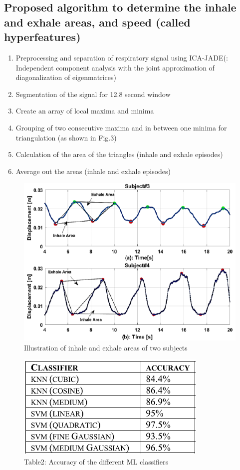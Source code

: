 \documentclass[dvipdfmx]{article}
\begin{document}
\subsection*{Proposed algorithm to determine the inhale and exhale areas, and speed (called hyperfeatures)}
\begin{enumerate}
    \item Preprocessing and separation of respiratory signal using ICA-JADE(: Independent component analysis with the joint approximation of diagonalization of eigenmatrices)
    \item Segmentation of the signal for 12.8 second window
    \item Create an array of local maxima and minima
    \item Grouping of two consecutive maxima and in between one minima for triangulation (as shown in Fig.3)
    \item Calculation of the area of the triangles (inhale and exhale episodes)
    \item Average out the areas (inhale and exhale episodes)
\end{enumerate}

\begin{figure}[H]
\begin{center}
\includegraphics[width=0.8\linewidth]{./img/triangulation.png}
\end{center}
\caption{Illustration of inhale and exhale areas of two subjects}
\end{figure}

\begin{figure}[H]
\caption*{Table2: Accuracy of the different ML classifiers}
\begin{center}
\includegraphics[width=0.8\linewidth]{./img/result_respi.png}
\end{center}
\end{figure}
\end{document}
